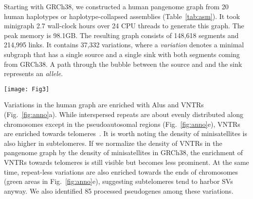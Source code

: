 \documentclass[twocolumn]{bmcart}%
\begin{document}
Starting with GRCh38, we constructed a human pangenome graph from 20 human
haplotypes or haplotype-collapsed assemblies (Table~\ref{tab:asm}). It took
minigraph 2.7 wall-clock hours over 24 CPU threads to generate this graph. The
peak memory is 98.1GB. The resulting graph consists of 148,618 segments and
214,995 links. It contains 37,332 variations, where a \emph{variation}
denotes a minimal subgraph that has a single source and a single sink with both
segments coming from GRCh38. A path through the bubble between the source and
and the sink represents an \emph{allele}.

\begin{figure*}[htbp]
\texttt{[image: Fig3]}
\caption{ {\bf
  (a)} Human variations stratified by repeat class and by the number of
  alleles of each variation. The repeat annotation was obtained from the
  longest allele of each variation. VNTR: variable-number tandem repeat, a
  tandem repeat with the unit motif length $\ge$7bp. STR: short random repeat,
  a tandem repeat with the unit motif length $\le$6bp. LCR: low-complexity
  regions. Mixed-inter.: a variation involving $\ge$2 types of interspersed
  repeats. {\bf (b)} Great ape variations stratified by repeat class and by the
  number of alleles. {\bf (c)} Human biallelic variations stratified by repeat
  class and by insertion to/deletion from GRCh38. Both alleles are required to
  be covered in all assemblies. {\bf (d)} Human-specific biallelic variations
  stratified by repeat class and by insertion to/deletion from GRCh38. Red bars
  correspond to insertions to the human lineage. {\bf (e)} Distribution of
  different types of human variations along chromosomes.  {\bf (f)} Boxplot of
  the longest allele length in each repeat class. Outliers are omitted for the
  clarity of the figure.}\label{fig:anno}
\end{figure*}

Variations in the human graph are enriched with Alus and VNTRs
(Fig.~\ref{fig:anno}a). While interspersed repeats are about evenly distributed
along chromosomes except in the pseudoautosomal regions (Fig.~\ref{fig:anno}e),
VNTRs are enriched towards telomeres~\cite{Audano:2019aa}. It is worth noting
the density of minisatellites is also higher in subtelomeres. If we normalize
the density of VNTRs in the pangenome graph by the density of minisatellites in
GRCh38, the enrichment of VNTRs towards telomeres is still visible but becomes
less prominent. At the same time, repeat-less variations are also enriched
towards the ends of chromosomes (green areas in Fig.~\ref{fig:anno}e),
suggesting subtelomeres tend to harbor SVs anyway. We also
identified 85 processed pseudogenes among these variations.
\end{document}
